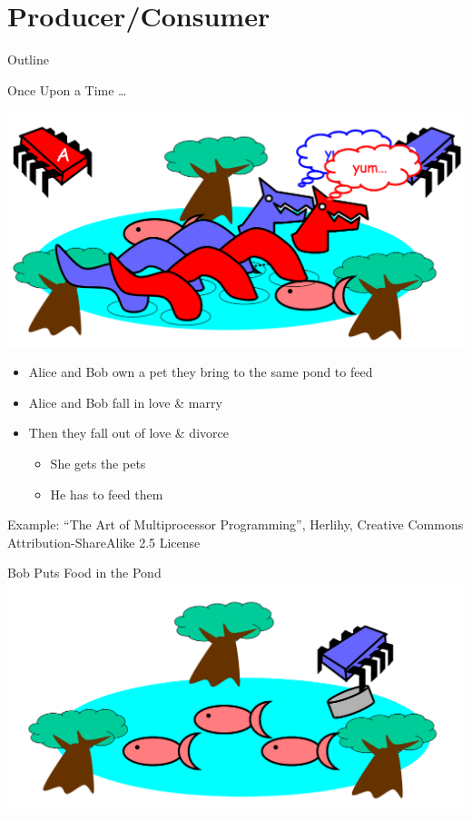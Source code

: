 \section{Producer/Consumer}

\begin{frame}{Outline}
  \tableofcontents[current]
\end{frame}

\begin{frame}{Once Upon a Time \ldots}
  \begin{center}
    \includegraphics[scale=0.35]{figures/pets-1}
  \end{center}


  \begin{itemize}
  \item Alice and Bob own a pet they bring to the same pond to feed
  \item Alice and Bob fall in love \& marry
  \item Then they fall out of love \& divorce
    \begin{itemize}
    \item She gets the pets
    \item He has to feed them
    \end{itemize}
  \end{itemize}

  \tiny{Example: ``The Art of Multiprocessor Programming'', Herlihy,
    Creative Commons Attribution-ShareAlike 2.5 License}
\end{frame}

\begin{frame}{Bob Puts Food in the Pond}
  \includegraphics[width=\textwidth]{figures/pets-2}
\end{frame}


